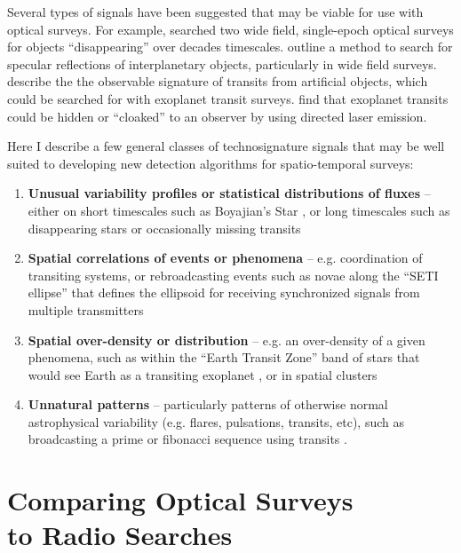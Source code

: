 \documentclass[twocolumn]{aastex62}
\begin{document}
Several types of signals have been suggested that may be viable for use with optical surveys. For example, \citet{villarroel2016} searched two wide field, single-epoch optical surveys for objects ``disappearing''  over decades timescales. \citet{lacki2019} outline a method to search for specular reflections of interplanetary objects, particularly in wide field surveys. \citet{arnold2005} describe the the observable signature of transits from artificial objects, which could be searched for with exoplanet transit surveys. \citet{kipping2016} find that exoplanet transits could be hidden or ``cloaked'' to an observer by using directed laser emission.

Here I describe a few general classes of technosignature signals that may be well suited to developing new detection algorithms for spatio-temporal surveys:

\begin{enumerate}
\item {\bf Unusual variability profiles or statistical distributions of fluxes }-- either on short timescales such as Boyajian's Star \citep{boyajian2015}, or long timescales such as disappearing stars \citep{villarroel2016} or occasionally missing transits \citep{kipping2016}
%
\item {\bf Spatial correlations of events or phenomena }-- e.g. coordination of transiting systems, or rebroadcasting events such as novae along the ``SETI ellipse''  that defines the ellipsoid for receiving synchronized signals from multiple transmitters 
\citep{makovetskii1977,lemarchand1994,tarter2001,shostak2004}
%
\item {\bf Spatial over-density or distribution} -- e.g. an over-density of a given phenomena, such as within the ``Earth Transit Zone'' band of stars that would see Earth as a transiting exoplanet \citep{heller2016}, or in spatial clusters
%
\item {\bf Unnatural patterns} -- particularly patterns of otherwise normal astrophysical variability (e.g. flares, pulsations, transits, etc), such as broadcasting a prime or fibonacci sequence using transits \citep{arnold2005,wright2016}.
% 
\end{enumerate}



\section{Comparing Optical Surveys\\ to Radio Searches}
\label{sec:haystack}
\end{document}
